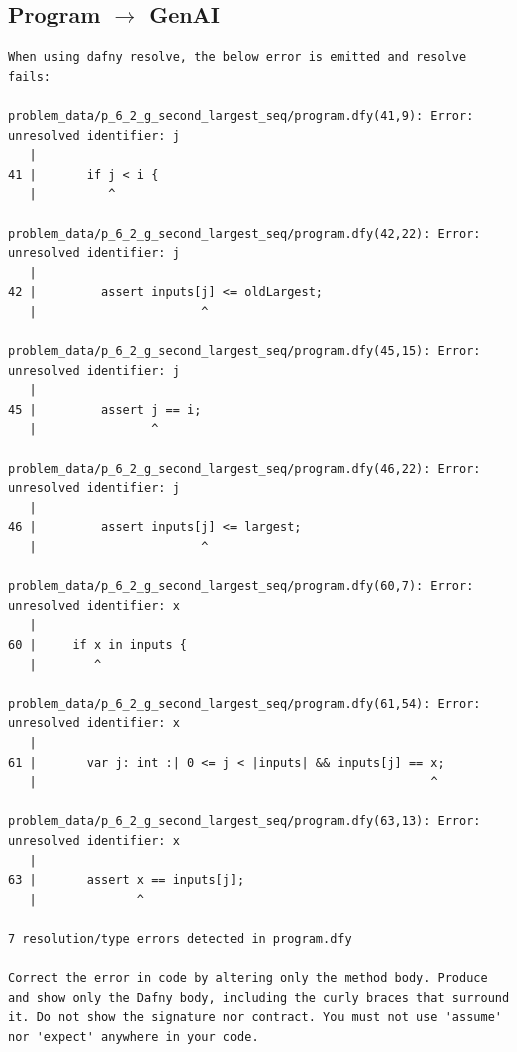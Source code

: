 \documentclass{article}
\begin{document}
\subsection*{Program $\rightarrow$ GenAI}
\begin{lstlisting}
When using dafny resolve, the below error is emitted and resolve fails:

problem_data/p_6_2_g_second_largest_seq/program.dfy(41,9): Error: unresolved identifier: j
   |
41 |       if j < i {
   |          ^

problem_data/p_6_2_g_second_largest_seq/program.dfy(42,22): Error: unresolved identifier: j
   |
42 |         assert inputs[j] <= oldLargest;
   |                       ^

problem_data/p_6_2_g_second_largest_seq/program.dfy(45,15): Error: unresolved identifier: j
   |
45 |         assert j == i;
   |                ^

problem_data/p_6_2_g_second_largest_seq/program.dfy(46,22): Error: unresolved identifier: j
   |
46 |         assert inputs[j] <= largest;
   |                       ^

problem_data/p_6_2_g_second_largest_seq/program.dfy(60,7): Error: unresolved identifier: x
   |
60 |     if x in inputs {
   |        ^

problem_data/p_6_2_g_second_largest_seq/program.dfy(61,54): Error: unresolved identifier: x
   |
61 |       var j: int :| 0 <= j < |inputs| && inputs[j] == x;
   |                                                       ^

problem_data/p_6_2_g_second_largest_seq/program.dfy(63,13): Error: unresolved identifier: x
   |
63 |       assert x == inputs[j];
   |              ^

7 resolution/type errors detected in program.dfy

Correct the error in code by altering only the method body. Produce and show only the Dafny body, including the curly braces that surround it. Do not show the signature nor contract. You must not use 'assume' nor 'expect' anywhere in your code.
\end{lstlisting}
\end{document}
